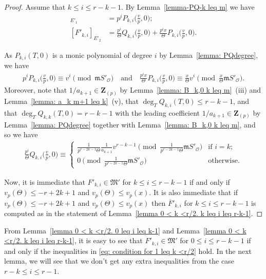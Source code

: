 \documentclass[11pt]{amsart}
\theoremstyle{definition}
\numberwithin{equation}{subsection}
\theoremstyle{plain}
\theoremstyle{plain}
\theoremstyle{plain}
\theoremstyle{plain}
\theoremstyle{plain}
\theoremstyle{plain}
\theoremstyle{plain}
\theoremstyle{plain}
\theoremstyle{plain}
\theoremstyle{plain}
\theoremstyle{plain}
\theoremstyle{plain}
\theoremstyle{definition}
\theoremstyle{definition}
\theoremstyle{definition}
\theoremstyle{remark}
\renewcommand{\(}{\textup{(}}
\renewcommand{\)}{\textup{)}}
\newcommand{\Z}{\mathbf{Z}}
\newcommand{\fM}{\mathfrak{M}}
\newcommand{\fm}{\mathfrak{m}}
\newcommand{\cO}{\mathcal{O}}
\newcommand{\barF}{\overline{F}}
\begin{document}
\begin{proof}
Assume that $k\leq i\leq r-k-1$. By Lemma~\ref{lemma-PQ-k leq m} we have
\begin{align*}
[F'_{k,i}]_{E'_1}&=p^i P_{k,i}\Big(\frac{v}{p},0\Big);\\
[F'_{k,i}]_{E'_2}&=\frac{p^i}{\Theta}Q_{k,i}\Big(\frac{v}{p},0\Big)
    +\frac{p^ix}{\Theta}P_{k,i}\Big(\frac{v}{p},0\Big).
\end{align*}

As $P_{k,i}(T,0)$ is a monic polynomial of degree $i$ by Lemma~\ref{lemma: PQdegree}, we have
\begin{align*}
    p^i P_{k,i}\Big(\frac{v}{p},0\Big)\equiv v^i \pmod{\fm S'_\cO}
\quad\mbox{and}\quad
\frac{p^ix}{\Theta}P_{k,i}\Big(\frac{v}{p},0\Big)
    \equiv \frac{x}{\Theta}v^i \pmod{\frac{x}{\Theta}\fm S'_\cO}.
\end{align*}
Moreover, note that ${1}/{a_{k+1}}\in\Z_{(p)}$ by Lemma~\ref{lemma: B_k,0 k leq m}~(iii) and Lemma~\ref{lemma: a_k m+1 leq k}~(v), that $\deg_T Q_{k,i}(T,0)\leq r-k-1$, and that $\deg_T Q_{k,k}(T,0)=r-k-1$ with the leading coefficient $1/a_{k+1}\in\Z_{(p)}$ by Lemma~\ref{lemma: PQdegree} together with Lemma~\ref{lemma: B_k,0 k leq m}, and so we have
\begin{align*}
    \frac{p^i}{\Theta}Q_{k,i}\Big(\frac{v}{p},0\Big)
    \equiv
    \begin{cases}
        \frac{1}{p^{r-2k-1}\Theta}\frac{1}{a_{k+1}}v^{r-k-1}\pmod{\frac{1}{p^{r-2k-1}\Theta}\fm S'_\cO} & \mbox{if } i=k;\\
        0\pmod{\frac{1}{p^{r-2k-1}\Theta}\fm S'_\cO} & \mbox{otherwise}.
    \end{cases}
\end{align*}

Now, it is immediate that $F'_{k,i}\in\fM'$ for $k\leq i\leq r-k-1$ if and only if $v_p(\Theta)\leq -r+2k+1$ and $v_p(\Theta)\leq v_p(x)$. It is also immediate that if $v_p(\Theta)\leq -r+2k+1$ and $v_p(\Theta)\leq v_p(x)$ then $\barF'_{k,i}$ for $k\leq i\leq r-k-1$ is computed as in the statement of Lemma~\ref{lemma 0 < k <r/2. k leq i leq r-k-1}.
\end{proof}



From Lemma~\ref{lemma 0 < k <r/2. 0 leq i leq k-1} and Lemma~\ref{lemma 0 < k <r/2. k leq i leq r-k-1}, it is easy to see that
$F'_{k,i}\in\fM'$ for $0\leq i\leq r-k-1$ if and only if the inequalities in \eqref{eq: condition for 1 leq k <r/2} hold. In the next lemma, we will see that we don't get any extra inequalities from the case $r-k\leq i\leq r-1$.
\end{document}
